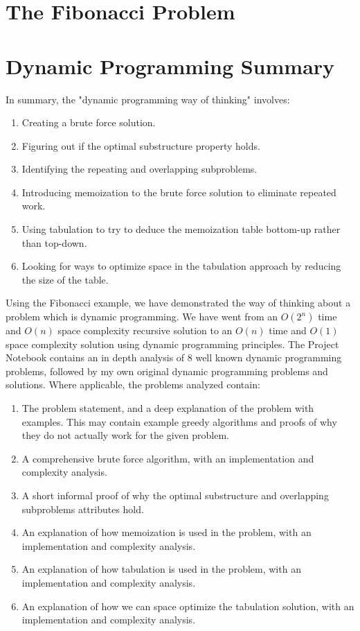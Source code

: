 \section{The Fibonacci Problem}


\section{Dynamic Programming Summary}

In summary, the "dynamic programming way of thinking" involves:
\begin{enumerate}
    \item Creating a brute force solution.
    \item Figuring out if the optimal substructure property holds.
    \item Identifying the repeating and overlapping subproblems.
    \item Introducing memoization to the brute force solution to eliminate repeated work.
    \item Using tabulation to try to deduce the memoization table bottom-up rather than top-down.
    \item Looking for ways to optimize space in the tabulation approach by reducing the size of the table.
\end{enumerate}

Using the Fibonacci example, we have demonstrated the way of thinking about a problem which is dynamic programming.
We have went from an $O(2^n)$ time and $O(n)$ space complexity recursive solution to an $O(n)$ time and $O(1)$ space complexity solution using dynamic programming principles.
The Project Notebook contains an in depth analysis of 8 well known dynamic programming problems, followed by my own original dynamic programming problems and solutions.
Where applicable, the problems analyzed contain:

\begin{enumerate}
    \item The problem statement, and a deep explanation of the problem with examples. This may contain example greedy algorithms and proofs of why they do not actually work for the given problem.
    \item A comprehensive brute force algorithm, with an implementation and complexity analysis.
    \item A short informal proof of why the optimal substructure and overlapping subproblems attributes hold.
    \item An explanation of how memoization is used in the problem, with an implementation and complexity analysis.
    \item An explanation of how tabulation is used in the problem, with an implementation and complexity analysis.
    \item An explanation of how we can space optimize the tabulation solution, with an implementation and complexity analysis.

\end{enumerate}

